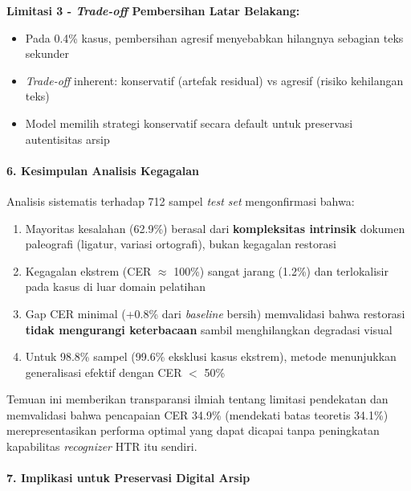 \documentclass[12pt,a4paper]{article}
\begin{document}
\textbf{Limitasi 3 - \textit{Trade-off} Pembersihan Latar Belakang:}
\begin{itemize}[nosep]
    \item Pada 0.4\% kasus, pembersihan agresif menyebabkan hilangnya sebagian teks sekunder
    \item \textit{Trade-off} inherent: konservatif (artefak residual) vs agresif (risiko kehilangan teks)
    \item Model memilih strategi konservatif secara default untuk preservasi autentisitas arsip
\end{itemize}

\paragraph{6. Kesimpulan Analisis Kegagalan}

Analisis sistematis terhadap 712 sampel \textit{test set} mengonfirmasi bahwa:
\begin{enumerate}[nosep]
    \item Mayoritas kesalahan (62.9\%) berasal dari \textbf{kompleksitas intrinsik} dokumen paleografi (ligatur, variasi ortografi), bukan kegagalan restorasi
    \item Kegagalan ekstrem (CER $\approx$ 100\%) sangat jarang (1.2\%) dan terlokalisir pada kasus di luar domain pelatihan
    \item Gap CER minimal (+0.8\% dari \textit{baseline} bersih) memvalidasi bahwa restorasi \textbf{tidak mengurangi keterbacaan} sambil menghilangkan degradasi visual
    \item Untuk 98.8\% sampel (99.6\% eksklusi kasus ekstrem), metode menunjukkan generalisasi efektif dengan CER $<$ 50\%
\end{enumerate}

Temuan ini memberikan transparansi ilmiah tentang limitasi pendekatan dan memvalidasi bahwa pencapaian CER 34.9\% (mendekati batas teoretis 34.1\%) merepresentasikan performa optimal yang dapat dicapai tanpa peningkatan kapabilitas \textit{recognizer} HTR itu sendiri.

\paragraph{7. Implikasi untuk Preservasi Digital Arsip}\mbox{}\\[0.1em]
\end{document}
